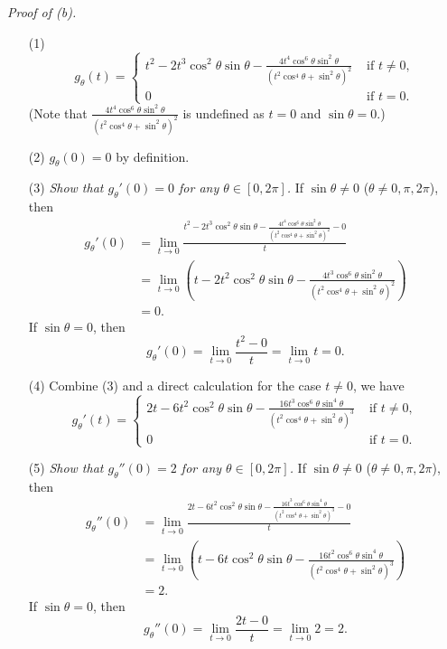 \documentclass{article}
\begin{document}
\emph{Proof of (b).}
\begin{enumerate}
\item[(1)]
  \begin{equation*}
    g_{\theta}(t) =
      \begin{cases}
        t^2 - 2t^3 \cos^2\theta\sin\theta
          - \frac{4t^4\cos^6\theta\sin^2\theta}{(t^2\cos^4\theta+\sin^2\theta)^2}
          & \text{ if $t \neq 0$}, \\
        0
          & \text{ if $t = 0$}.
      \end{cases}
  \end{equation*}
  (Note that $\frac{4t^4\cos^6\theta\sin^2\theta}{(t^2\cos^4\theta+\sin^2\theta)^2}$
  is undefined as $t = 0$ and $\sin\theta = 0$.)

\item[(2)]
  $g_{\theta}(0) = 0$ by definition.

\item[(3)]
  \emph{Show that $g_{\theta}'(0) = 0$ for any $\theta \in [0,2\pi]$.}
  If $\sin\theta \neq 0$ ($\theta \neq 0, \pi, 2\pi$), then
  \begin{align*}
    g_{\theta}'(0)
    &= \lim_{t \to 0}
      \frac{t^2 - 2t^3 \cos^2\theta\sin\theta
        - \frac{4t^4\cos^6\theta\sin^2\theta}{(t^2\cos^4\theta+\sin^2\theta)^2} - 0}{t} \\
    &= \lim_{t \to 0}
      \left( t - 2t^2 \cos^2\theta\sin\theta
        - \frac{4t^3\cos^6\theta\sin^2\theta}{(t^2\cos^4\theta+\sin^2\theta)^2} \right) \\
    &= 0.
  \end{align*}
  If $\sin\theta = 0$, then
  \[
    g_{\theta}'(0)
    = \lim_{t \to 0} \frac{t^2 - 0}{t}
    = \lim_{t \to 0} t
    = 0.
  \]

\item[(4)]
  Combine (3) and a direct calculation for the case $t \neq 0$, we have
  \begin{equation*}
    g_{\theta}'(t) =
      \begin{cases}
        2t - 6t^2\cos^2\theta\sin\theta
          - \frac{16t^3\cos^6\theta\sin^4\theta}{(t^2\cos^4\theta+\sin^2\theta)^3}
          & \text{ if $t \neq 0$}, \\
        0
          & \text{ if $t = 0$}.
      \end{cases}
  \end{equation*}

\item[(5)]
  \emph{Show that $g_{\theta}''(0) = 2$ for any $\theta \in [0,2\pi]$.}
  If $\sin\theta \neq 0$ ($\theta \neq 0, \pi, 2\pi$), then
  \begin{align*}
    g_{\theta}''(0)
    &= \lim_{t \to 0}
      \frac{2t - 6t^2\cos^2\theta\sin\theta
        - \frac{16t^3\cos^6\theta\sin^4\theta}{(t^2\cos^4\theta+\sin^2\theta)^3} - 0}{t} \\
    &= \lim_{t \to 0}
      \left( t - 6t\cos^2\theta\sin\theta
        - \frac{16t^2\cos^6\theta\sin^4\theta}{(t^2\cos^4\theta+\sin^2\theta)^3} \right) \\
    &= 2.
  \end{align*}
  If $\sin\theta = 0$, then
  \[
    g_{\theta}''(0)
    = \lim_{t \to 0} \frac{2t - 0}{t}
    = \lim_{t \to 0} 2
    = 2.
  \]


\end{enumerate}
\end{document}
